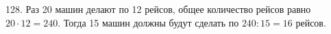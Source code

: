 128. Раз 20 машин делают по 12 рейсов, общее количество рейсов равно $20\cdot12=240.$ Тогда 15 машин должны будут сделать по $240:15=16$ рейсов.\\
